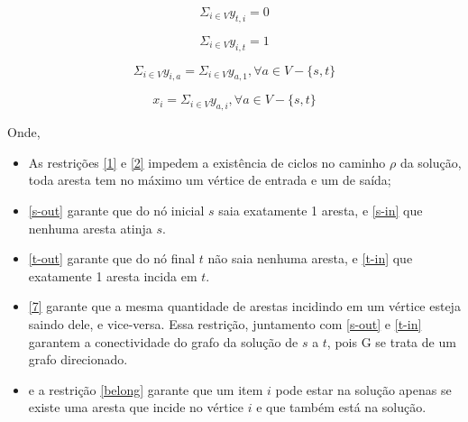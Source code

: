 \documentclass[conference]{IEEEtran}
\begin{document}
    \begin{equation}
        \Sigma_{i \in V} y_{t,i} = 0
        \label{t-out}
    \end{equation}

    \begin{equation}
        \Sigma_{i \in V} y_{i,t} = 1
        \label{t-in}
    \end{equation}

    \begin{equation}
        \Sigma_{i \in V} y_{i,a} = \Sigma_{i \in V} y_{a,1}, \forall a \in V - \{s,t\}
        \label{7}
    \end{equation}

    \begin{equation}
        x_i = \Sigma_{i \in V} y_{a,i}, \forall a \in V - \{s,t\}
        \label{belong}
    \end{equation}

    Onde,

    \begin{itemize}
        \item As restrições \ref{1} e \ref{2} impedem a existência de ciclos no caminho $\rho$ da solução, toda aresta tem no máximo um vértice de entrada e um de saída;
        \item \ref{s-out} garante que do nó inicial $s$ saia  exatamente 1 aresta, e \ref{s-in} que nenhuma aresta atinja  $s$.
        \item \ref{t-out} garante que do nó final $t$ não saia  nenhuma aresta, e \ref{t-in} que exatamente 1 aresta incida em $t$.
        \item \ref{7} garante que a mesma quantidade de arestas incidindo em um vértice esteja saindo dele, e vice-versa. Essa restrição, juntamento com \ref{s-out} e \ref{t-in} garantem a conectividade do grafo da solução de $s$ a $t$, pois G se trata de um grafo direcionado.
        \item e a restrição \ref{belong} garante que um item $i$ pode estar na solução apenas se existe uma aresta que incide no vértice $i$ e que também está na solução.

    \end{itemize}
\end{document}
